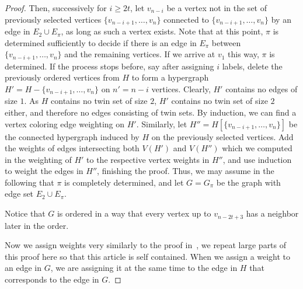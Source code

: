 \documentclass[reqno,12pt,epsf]{amsart}
\begin{document}
\begin{proof}
Then, successively for $i\ge 2t$, let $v_{n-i}$ be a vertex not in the set of previously selected vertices $\{v_{n-i+1},\ldots,v_n\}$ connected to $\{v_{n-i+1},\ldots,v_n\}$ by an edge in $E_2\cup E_\pi$, as long as  such a vertex exists. Note that at this point, $\pi$ is determined sufficiently to decide if there is an edge in $E_\pi$ between $\{v_{n-i+1},\ldots,v_n\}$ and the remaining vertices. If we arrive at $v_1$ this way, $\pi$ is determined. If the process stops before, say after assigning $i$ labels, delete the previously ordered vertices from $H$ to form a hypergraph $H'=H-\{v_{n-i+1},\ldots,v_n\}$ on $n'=n-i$ vertices. Clearly, $H'$ contains no edges of size $1$. As $H$ contains no twin set of size $2$, $H'$ contains no twin set of size $2$ either, and therefore no edges consisting of twin sets. By induction, we can find a vertex coloring edge weighting on $H'$. Similarly, let $H''=H[\{v_{n-i+1},\ldots,v_n\}]$ be the connected hypergraph induced by $H$ on the previously selected vertices. Add the weights of edges intersecting both $V(H')$ and $V(H'')$ which we computed in the weighting of $H'$ to the respective vertex weights in $H''$, and use induction to weight the edges in $H''$, finishing the proof. Thus, we may assume in the following that $\pi$ is completely determined, and let 
 $G=G_\pi$  be the graph with edge set $E_2\cup E_\pi$.

Notice that $G$  is ordered in a way that every vertex up to $v_{n-2t+3}$ has a neighbor later in the order.
 
 Now we assign weights very similarly to the proof in~\cite{KKP}, we repeat large parts of this proof here so that this article is self contained. When we assign a weight to an edge in $G$, we are assigning it at the same time to the edge in $H$ that corresponds to the edge in $G$. 




\end{proof}
\end{document}

